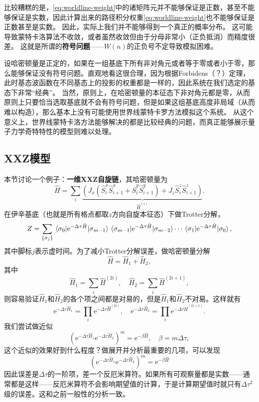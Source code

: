 \documentclass[hyperref, UTF8, a4paper]{ctexart}
\newcommand*{\ee}{\mathrm{e}}
\newcommand*{\concept}[1]{{\textbf{#1}}}
\begin{document}

比较糟糕的是，\eqref{eq:worldline-weight}中的诸矩阵元并不能够保证是正数，甚至不能够保证是实数，因此计算出来的路径积分权重\eqref{eq:worldline-weight}也不能够保证是正数甚至是实数。
因此，实际上我们并不能够得到一个真正的概率分布。
这可能导致蒙特卡洛算法不收敛，或者虽然收敛但由于分母非常小（正负抵消）而精度很差。
这就是所谓的\concept{符号问题}——$W(n)$的正负号不定导致模拟困难。

设哈密顿量是正定的，如果在一组基底下所有非对角元或者等于零或者小于零，那么能够保证没有符号问题。直观地看这很合理，因为根据Forbidens（？）定理，此时基态波函数在不同基态上的投影的权重都是一样的，因此系统在我们选定的基态下非常“经典”。
当然，原则上，在哈密顿量的本征态下非对角元都是零，从而原则上只要恰当选取基底就不会有符号问题，但是如果这组基底高度非局域（从而难以构造），那么基本上没有可能使用世界线蒙特卡罗方法模拟这个系统。
从这个意义上，世界线蒙特卡洛方法能够解决的都是比较经典的问题，而真正能够展示量子力学奇特特性的模型则难以处理。

\subsection{XXZ模型}

本节讨论一个例子：\concept{一维XXZ自旋链}，其哈密顿量为
\begin{equation}
    \hat{H} = \sum_{i} \underbrace{(J_x (\hat{S}_i^x \hat{S}_{i+1}^x + \hat{S}^y_i \hat{S}^y_{i+1}) + J_z \hat{S}_i^z \hat{S}^z_{i+1})}_{\hat{H}^{(i)}}.
\end{equation}
在伊辛基底（也就是所有格点都取$z$方向自旋本征态）下做Trotter分解，
\[
    Z = \sum_{\{\sigma_{j}\}} \mel*{\sigma_{0}}{\ee^{-\Delta \tau \hat{H}}}{\sigma_{m-1}} \mel*{\sigma_{m-1}}{\ee^{-\Delta \tau \hat{H}}}{\sigma_{m-2}} \cdots \mel*{\sigma_{1}}{\ee^{-\Delta \tau \hat{H}}}{\sigma_{0}},
\]
其中脚标$j$表示虚时间。为了减小Trotter分解误差，做哈密顿量分解
\[
    \hat{H} = \hat{H}_1 + \hat{H}_2, 
\]
其中
\[
    \hat{H}_1 = \sum_{i} \hat{H}^{(2i)}, \quad \hat{H}_2 = \sum_i \hat{H}^{(2i+1)},
\]
则容易验证$\hat{H}_1$和$\hat{H}_2$的各个项之间都是对易的，但是$\hat{H}_1$和$\hat{H}_2$不对易。这样就有
\[
    \ee^{-\Delta \tau \hat{H}_1} = \prod_i \ee^{-\Delta \tau \hat{H}^{(2i)}}, \quad \ee^{-\Delta \tau \hat{H}_2} = \prod_i \ee^{-\Delta \tau \hat{H}^{(2i+1)}}.
\]
我们尝试做近似
\begin{equation}
    \left( \ee^{-\Delta \tau \hat{H}_1} \ee^{-\Delta \tau \hat{H}_2} \right)^m = \ee^{-\beta \hat{H}}, \quad \beta = m \Delta \tau,
\end{equation}
这个近似的效果好到什么程度？做展开并分析最重要的几项，可以发现
\[
    \left( \ee^{-\Delta \tau \hat{H}_1} \ee^{-\Delta \tau \hat{H}_2} \right)^m = \ee^{-\beta \hat{H}} 
\]
因此误差是$\Delta \tau$的一阶项，差一个反厄米算符。如果所有可观察量都是实数——通常都是这样——反厄米算符不会影响期望值的计算，于是计算期望值时就只有$\Delta \tau^2$级的误差。这和之前一般性的分析一致。
\end{document}
